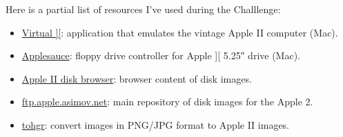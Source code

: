 Here is a partial list of resources I've used during the Challlenge:
\begin{itemize}
\item \href{http://www.virtualii.com/}{Virtual ][}: application that emulates the vintage Apple II computer (Mac).
\item \href{https://applesaucefdc.com/}{Applesauce}: floppy drive controller
for Apple ][ 5.25″ drive (Mac).
\item \href{https://github.com/dmolony/DiskBrowser}{Apple II disk browser}: browser content of disk images.
\item \href{https://mirrors.apple2.org.za/ftp.apple.asimov.net/}{ftp.apple.asimov.net}: main repository of disk images for the Apple 2.
\item \href{http://wsxyz.net/tohgr.html}{tohgr}: convert images in PNG/JPG format to Apple II images. 
\end{itemize}


